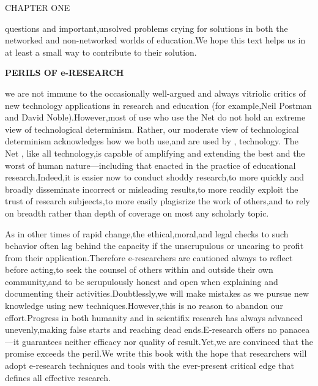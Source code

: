 \documentclass[10pt,a4paper]{book}
\begin{document}
\begin{flushleft}
  \textbf{\!\!\!\!\!\!\!\!\!\!\!} \qquad CHAPTER ONE
\end{flushleft}

\!\!\!\!\!\!\!\!\!questions and important,unsolved problems crying for solutions in both the networked and non-networked worlds of education.We hope this text helps us in at least a small way to contribute to their solution.

\begin{flushleft}
  \textbf{\!\!\!\!\!\!\!\!\!\!\!\!PERILS OF e-RESEARCH}
\end{flushleft}

\!\!\!\!\!\!\!\!\!\!we are not immune to the occasionally well-argued and always vitriolic critics of new technology applications in research and education (for example,Neil Postman and David Noble).However,most of use who use the Net do not hold an extreme view of technological determinism. Rather, our moderate view of technological determinism acknowledges how we both use,and are used by , technology. The Net , like all technology,is capable of amplifying and extending the best and the worst of human nature---including that enacted in the practice of educational research.Indeed,it is easier now to conduct shoddy research,to more quickly and broadly disseminate incorrect or misleading results,to more readily exploit the trust of research subjeects,to more easily plagisrize the work of others,and to rely on breadth rather than depth of coverage on most any scholarly topic.

As in other times of rapid change,the ethical,moral,and legal checks to such behavior often lag behind the capacity if the unscrupulous or uncaring to profit from their application.Therefore e-researchers are cautioned always to reflect before acting,to seek the counsel of others within and outside their own community,and to be scrupulously honest and open when explaining and documenting their activities.Doubtlessly,we will make mistakes as we pursue new knowledge using new techniques.However,this is no reason to abandon our effort.Progress in both humanity and in scientifix research has always advanced unevenly,making false starts and reaching dead ends.E-research offers no panacea---it guarantees neither efficacy nor quality of result.Yet,we are convinced that the promise exceeds the peril.We write this book with the hope that researchers will adopt e-research techniques and tools with the ever-present critical edge that defines all effective research.
\end{document}
